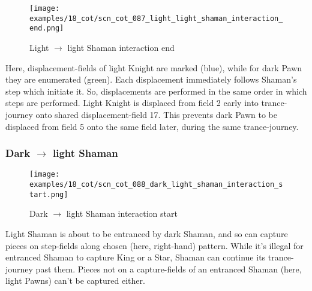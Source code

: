 \clearpage %

\noindent
\begin{figure}[!h]
\texttt{[image: examples/18\_cot/scn\_cot\_087\_light\_light\_shaman\_interaction\_end.png]}
\caption{Light $\rightarrow$ light Shaman interaction end}
\label{fig:scn_cot_087_light_light_shaman_interaction_end}
\end{figure}

Here, displacement-fields of light Knight are marked (blue), while for dark Pawn
they are enumerated (green). Each displacement immediately follows Shaman's step
which initiate it. So, displacements are performed in the same order in which steps
are performed. Light Knight is displaced from field 2 early into trance-journey
onto shared displacement-field 17. This prevents dark Pawn to be displaced from
field 5 onto the same field later, during the same trance-journey.

\clearpage %

\subsubsection*{Dark $\rightarrow$ light Shaman}
\label{sec:Conquest of Tlalocan/Trance-journey/Interactions/Dark --> light Shaman}

\vspace*{-1.4\baselineskip}
\noindent
\begin{figure}[!h]
\texttt{[image: examples/18\_cot/scn\_cot\_088\_dark\_light\_shaman\_interaction\_start.png]}
\caption{Dark $\rightarrow$ light Shaman interaction start}
\label{fig:scn_cot_088_dark_light_shaman_interaction_start}
\end{figure}

Light Shaman is about to be entranced by dark Shaman, and so can capture pieces
on step-fields along chosen (here, right-hand) pattern. While it's illegal for
entranced Shaman to capture King or a Star, Shaman can continue its trance-journey
past them. Pieces not on a capture-fields of an entranced Shaman (here, light Pawns)
can't be captured either.

\clearpage %

